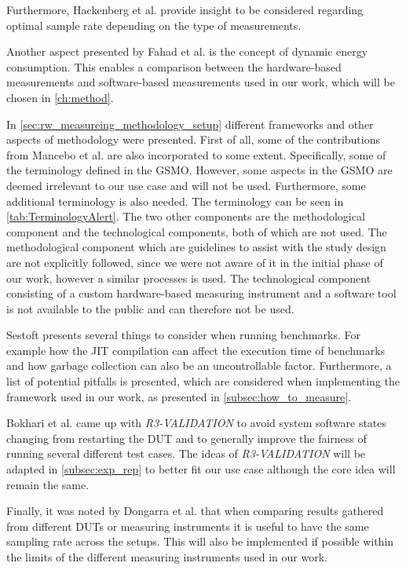 Furthermore, Hackenberg et al.\cite{hackenberg2013} provide insight to be considered regarding optimal sample rate depending on the type of measurements.

Another aspect presented by Fahad et al.\cite{fahad2019comparative} is the concept of dynamic energy consumption. This enables a comparison between the hardware-based measurements and software-based measurements used in our work, which will be chosen in \cref{ch:method}.\newline


In \cref{sec:rw_measureing_methodology_setup} different frameworks and other aspects of methodology were presented. First of all, some of the contributions from Mancebo et al. \cite{GarciaFEETINGS} are also incorporated to some extent. Specifically, some of the terminology defined in the GSMO. However, some aspects in the GSMO are deemed irrelevant to our use case and will not be used. Furthermore, some additional terminology is also needed. The terminology can be seen in \cref{tab:TerminologyAlert}. The two other components are the methodological component and the technological components, both of which are not used. The methodological component which are guidelines to assist with the study design are not explicitly followed, since we were not aware of it in the initial phase of our work, however a similar processes is used. The technological component consisting of a custom hardware-based measuring instrument and a software tool is not available to the public and can therefore not be used.

Sestoft\cite{sestoft2013microbenchmarks} presents several things to consider when running benchmarks. For example how the JIT compilation can affect the execution time of benchmarks and how garbage collection can also be an uncontrollable factor. Furthermore, a list of potential pitfalls is presented, which are considered when implementing the framework used in our work, as presented in \cref{subsec:how_to_measure}.

Bokhari et al.\cite{Bokhari2020r3} came up with \textit{R3-VALIDATION} to avoid system software states changing from restarting the DUT and to generally improve the fairness of running several different test cases. The ideas of \textit{R3-VALIDATION} will be adapted in \cref{subsec:exp_rep} to better fit our use case although the core idea will remain the same.

Finally, it was noted by Dongarra et al.\cite{Dongarra2012} that when comparing results gathered from different DUTs or measuring instruments it is useful to have the same sampling rate across the setups. This will also be implemented if possible within the limits of the different measuring instruments used in our work.

